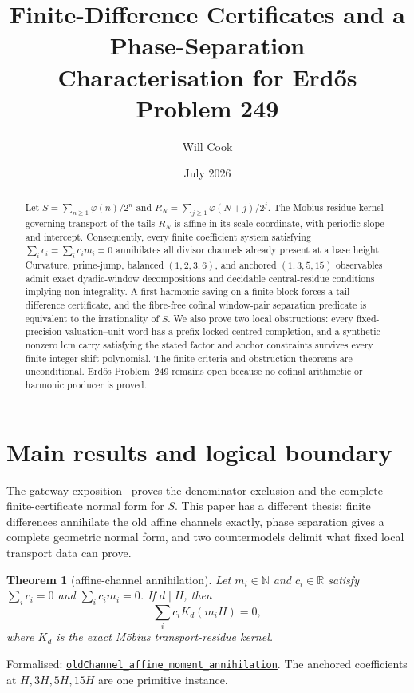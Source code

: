 \documentclass[11pt]{article}
\title{Finite-Difference Certificates and a Phase-Separation\\
Characterisation for Erd\H{o}s Problem 249}
\author{Will Cook}
\date{July 2026}
\newcommand{\commit}{81150c1c6fdd4cd51e76d3aa0de344341e0e9e7c}
\newcommand{\repobase}{https://github.com/wcook04/plectis-lean-erdos249-257/blob/\commit}
\newcommand{\PK}{Erdos249257}
\newcommand{\lref}[3]{\href{\repobase/\PK/#1\#L#2}{\nolinkurl{#3}}}
\newtheorem{theorem}{Theorem}[section]
\theoremstyle{remark}\newtheorem*{remark}{Remark}
\newcommand{\ph}{\varphi}
\begin{document}
\sloppy
\maketitle
\begin{abstract}
Let $S=\sum_{n\geq1}\ph(n)/2^n$ and
$R_N=\sum_{j\geq1}\ph(N+j)/2^j$.  The M\"obius residue kernel governing
transport of the tails $R_N$ is affine in its scale coordinate, with periodic
slope and intercept.  Consequently, every finite coefficient system satisfying
$\sum_i c_i=\sum_i c_im_i=0$ annihilates all divisor channels already present
at a base height.  Curvature, prime-jump, balanced $(1,2,3,6)$, and anchored
$(1,3,5,15)$ observables admit exact dyadic-window decompositions and
decidable central-residue conditions implying non-integrality.  A
first-harmonic saving on a finite block forces a tail-difference certificate,
and the fibre-free cofinal window-pair separation predicate is equivalent to
the irrationality of $S$.  We also prove two local obstructions: every
fixed-precision valuation--unit word has a prefix-locked centred completion,
and a synthetic nonzero lcm carry satisfying the stated factor and anchor
constraints survives every finite integer shift polynomial.  The finite
criteria and obstruction theorems are unconditional.  Erd\H{o}s Problem~249
remains open because no cofinal arithmetic or harmonic producer is proved.
\end{abstract}

\section{Main results and logical boundary}\label{sec:scope}

The gateway exposition~\cite{mainpaper} proves the denominator exclusion and
the complete finite-certificate normal form for $S$.  This paper has a
different thesis: finite differences annihilate the old affine channels
exactly, phase separation gives a complete geometric normal form, and two
countermodels delimit what fixed local transport data can prove.

\begin{theorem}[affine-channel annihilation]\label{thm:affine}
Let \(m_i\in\mathbb N\) and \(c_i\in\mathbb R\) satisfy
\(\sum_i c_i=0\) and \(\sum_i c_im_i=0\).  If \(d\mid H\), then
\[
  \sum_i c_i K_d(m_iH)=0,
\]
where \(K_d\) is the exact M\"obius transport-residue kernel.
\end{theorem}
\noindent Formalised:
\lref{JointExponentTransport.lean}{36}{oldChannel_affine_moment_annihilation}.
The anchored coefficients at \(H,3H,5H,15H\) are one primitive instance.
\end{document}
